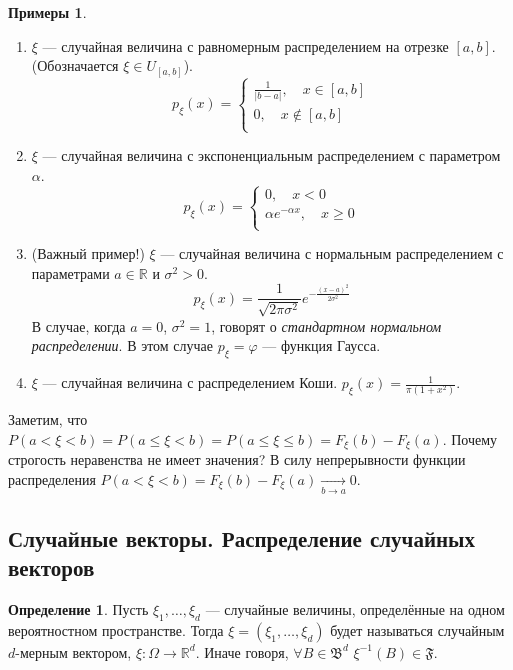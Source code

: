 \documentclass[11pt,openany,a4paper]{scrartcl}
\theoremstyle{plain}
\theoremstyle{definition}
\newtheorem{definition}[theorem]{Определение}
\newtheorem{examples}[theorem]{Примеры}
\newcommand\mb{\mathbb}
\newcommand\real{\mb R}
\newcommand{\underto}[1]{\xrightarrow[#1]{}}
\begin{document}
\begin{examples}
    \begin{enumerate}
        \item $\xi$ — случайная величина с равномерным распределением на
        отрезке $[a,b]$. (Обозначается $\xi \in U_{[a,b]}$).
        $$
        p_\xi (x) =
        \begin{cases}
            \frac{1}{|b-a|},\quad x \in [a,b] \\
            0, \quad x \notin [a,b] \\
        \end{cases}
        $$
        \item $\xi$ — случайная величина с экспоненциальным распределением с 
        параметром $\alpha$.
        $$
        p_\xi(x) =
        \begin{cases}
            0,\quad x < 0 \\
            \alpha e^{-\alpha x},\quad x \geqslant 0 \\
        \end{cases}
        $$
        \item (Важный пример!) $\xi$ — случайная величина с нормальным 
        распределением с параметрами $a \in \real$ и $\sigma^2 > 0$.
        $$
        p_\xi(x) = \frac{1}{\sqrt{2\pi \sigma^2}}e^{- \frac{(x - a)^2}{2\sigma^2}}
        $$
        В случае, когда $a = 0$, $\sigma^2 = 1$, говорят о \emph{стандартном 
        нормальном распределении}.
        В этом случае $p_\xi = \varphi$ — функция Гаусса.
        \item $\xi$ — случайная величина с распределением Коши.
        $p_\xi(x) = \frac{1}{\pi (1 + x^2)}$.
    \end{enumerate}
\end{examples}

Заметим, что $P(a < \xi < b) = P(a \leqslant \xi < b) =
P(a \leqslant \xi \leqslant b) = F_\xi(b) - F_\xi(a)$. Почему строгость неравенства
не имеет значения? В силу непрерывности функции распределения
$P(a < \xi < b) = F_\xi(b) - F_\xi(a) \underto{b \to a} 0$.

\subsection{Случайные векторы. Распределение случайных векторов}

\begin{definition}
    Пусть $\xi_1, \ldots, \xi_d$ — случайные величины, определённые на одном
    вероятностном пространстве. Тогда $\xi = (\xi_1, \ldots, \xi_d)$ будет
    называться случайным $d$-мерным вектором, $\xi: \Omega \to \real^d$.
    Иначе говоря, $\forall B \in \mathfrak B^d$ $\xi^{-1}(B) \in \mathfrak F$.
\end{definition}
\end{document}
